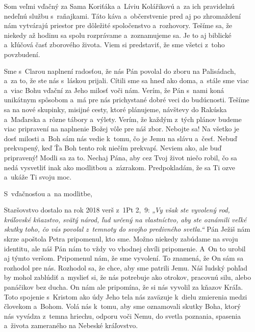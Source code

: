 
Som veľmi vďačný za Sama Koriťáka a~Líviu Kolářikovú a~za ich pravidelnú nedeľnú službu s~raňajkami. Táto káva a~občerstvenie pred aj po zhromaždení nám vytvárajú priestor pre dôležité spoločenstvo a~rozhovory. Tešíme sa, že niekedy až hodinu sa spolu rozprávame a~zoznamujeme sa. Je to aj biblické a~kľúčová časť zborového života. Viem si predstaviť, že sme všetci z~toho povzbudení.


Sme s~Clarou naplnení radosťou, že nás Pán povolal do zboru na Palisádach, a~za to, že ste nás s~láskou prijali. Cítili sme sa hneď ako doma, a~stále sme viac a~viac Bohu vďační za Jeho milosť voči nám. Verím, že Pán s~nami koná unikátnym spôsobom a~má pre nás prichystané dobré veci do budúcnosti. Tešíme sa na nové skupinky, misijné cesty, ktoré plánujeme, návštevy do Rakúska a~Maďarska a~rôzne tábory a~výlety. Verím, že každým z~tých plánov budeme viac pripravení na naplnenie Božej vôle pre náš zbor. Nebojte sa! Na všetko je dosť milosti a~Boh sám nás vedie k~tomu, čo je Jemu na slávu a~česť.  Nebuď prekvapený, keď Ťa Boh tento rok niečím prekvapí. Neviem ako, ale buď pripravený! Modli sa za to. Nechaj  Pána, aby cez Tvoj život niečo robil, čo sa nedá vysvetliť inak ako modlitbou a~zázrakom. Predpokladám, že sa Ti ozve a~ukáže Ti svoju moc.

S~vďačnosťou a~na modlitbe,



Staršovstvo dostalo na rok 2018 verš z~1Pt 2,~9: {\it „Vy však ste vyvolený rod, kráľovské kňazstvo, svätý národ, ľud určený na vlastníctvo, aby ste oznámili veľké skutky toho, čo vás povolal z~temnoty do svojho predivného svetla.“}  Pán Ježiš nám skrze apoštola Petra pripomenul, kto sme. Možno niekedy zabúdame na svoju identitu, ale náš Pán nám to vždy vo vhodnej chvíli pripomenie. A~On to urobil aj týmto veršom. Pripomenul nám, že sme vyvolení. To znamená, že On sám sa rozhodol pre nás. Rozhodol sa, že chce, aby sme patrili Jemu. Náš ľudský pohľad by mohol zablúdiť a~myslieť si, že nás potrebuje ako otrokov, pracovnú silu, alebo panáčikov bez ducha. On nám ale pripomína, že si nás vyvolil za kňazov Kráľa. Toto spojenie s~Kristom ako údy Jeho tela nás zaväzuje k~dielu zmierenia medzi človekom a~Bohom. Volá nás k~tomu, aby sme oznamovali skutky Boha, ktorý nás vyvádza z~temna hriechu, odporu voči Nemu, do svetla poznania, spasenia a~života zameraného na Nebeské kráľovstvo.

